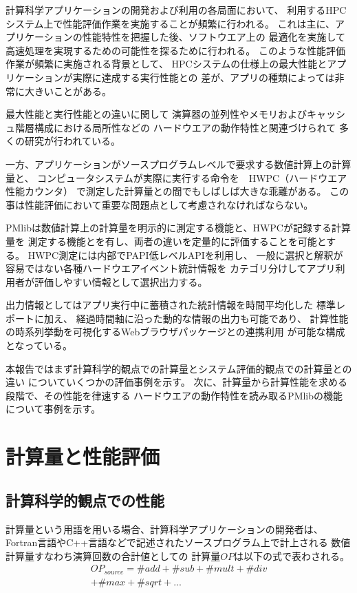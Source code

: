 \documentclass[submit,techrep,noauthor]{ipsj}
\begin{document}
計算科学アプリケーションの開発および利用の各局面において、
利用するHPCシステム上で性能評価作業を実施することが頻繁に行われる。
これは主に、アプリケーションの性能特性を把握した後、ソフトウエア上の
最適化を実施して高速処理を実現するための可能性を探るために行われる。
このような性能評価作業が頻繁に実施される背景として、
HPCシステムの仕様上の最大性能とアプリケーションが実際に達成する実行性能との
差が、アプリの種類によっては非常に大きいことがある。

最大性能と実行性能との違いに関して
演算器の並列性やメモリおよびキャッシュ階層構成における局所性などの
ハードウエアの動作特性と関連づけられて
多くの研究が行われている。

一方、アプリケーションがソースプログラムレベルで要求する数値計算上の計算量と、
コンピュータシステムが実際に実行する命令を　HWPC（ハードウエア性能カウンタ）
で測定した計算量との間でもしばしば大きな乖離がある。
この事は性能評価において重要な問題点として考慮されなければならない。

PMlibは数値計算上の計算量を明示的に測定する機能と、HWPCが記録する計算量を
測定する機能とを有し、両者の違いを定量的に評価することを可能とする。
HWPC測定には内部でPAPI低レベルAPIを利用し、
一般に選択と解釈が容易ではない各種ハードウエアイベント統計情報を
カテゴリ分けしてアプリ利用者が評価しやすい情報として選択出力する。

出力情報としてはアプリ実行中に蓄積された統計情報を時間平均化した
標準レポートに加え、
経過時間軸に沿った動的な情報の出力も可能であり、
計算性能の時系列挙動を可視化するWebブラウザパッケージとの連携利用
が可能な構成となっている。

本報告ではまず計算科学的観点での計算量とシステム評価的観点での計算量との違い
についていくつかの評価事例を示す。
次に、計算量から計算性能を求める段階で、その性能を律速する
ハードウエアの動作特性を読み取るPMlibの機能について事例を示す。



\section {計算量と性能評価}
\label{section:computing-volume}

\subsection {計算科学的観点での性能}
\label{subsection:scientific-perf}
計算量という用語を用いる場合、計算科学アプリケーションの開発者は、
Fortran言語やC++言語などで記述されたソースプログラム上で計上される
数値計算量すなわち演算回数の合計値としての
計算量\begin{math} OP \end{math}は以下の式で表わされる。
\begin{align*}
OP_{source} = \#add + \#sub + \#mult + \#div \\
	+ \#max + \#sqrt + ...
\end{align*}
\end{document}
